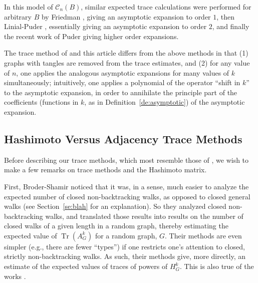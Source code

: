 \documentclass{memo-l}
\theoremstyle{plain}
\theoremstyle{definition}
\numberwithin{section}{chapter}
\numberwithin{equation}{chapter}
\DeclareMathOperator{\Tr}{Tr}
\theoremstyle{plain}
\theoremstyle{definition}
\newcommand\cC{\mathcal{C}}
\begin{document}
{In this model of $\cC_n(B)$, similar expected trace calculations
were performed for arbitrary $B$ by
Friedman \cite{friedman_relative}, giving an asymptotic expansion to
order $1$, then Linial-Puder \cite{linial_puder}, essentially giving
an asymptotic expansion to order $2$, and finally the recent work of Puder
\cite{puder} giving higher order expansions.

The trace method of \cite{friedman_alon} and this article differs from
the above methods in that (1) graphs with tangles are removed from
the trace estimates, and (2) for any value of $n$, one applies the
analogous asymptotic expansions for many values of $k$ simultaneously;
intuitively, one applies a polynomial of the operator ``shift in $k$''
to the asymptotic expansion, in order to annihilate the principle
part of the coefficients (functions in $k$, as in
Definition~\ref{de:asymptotic}) of the asymptotic
expansion.

\subsection{Hashimoto Versus Adjacency Trace Methods}

Before describing our trace methods, which most resemble those
of \cite{friedman_alon}, we wish to make a few remarks on trace methods
and the Hashimoto matrix.

First, Broder-Shamir noticed that it was, in a sense, much easier to
analyze the expected number of closed non-backtracking walks, as 
opposed to closed general walks
(see Section~\ref{se:blah} for an explanation).  
So they analyzed closed non-backtracking
walks, and translated those results into results on the number of 
closed walks of a given length in a random graph, thereby estimating
the expected value of 
$\Tr(A_G^k)$ for a random graph, $G$.
Their methods are even simpler (e.g., there are fewer ``types'') if one
restricts one's attention to closed, strictly non-backtracking 
walks.  As such, their methods give, more directly, an estimate of
the expected values of traces of powers of $H_G^k$.
This is also true of the works
\cite{friedman_random_graphs,friedman_relative,friedman_alon}.

}
\end{document}

